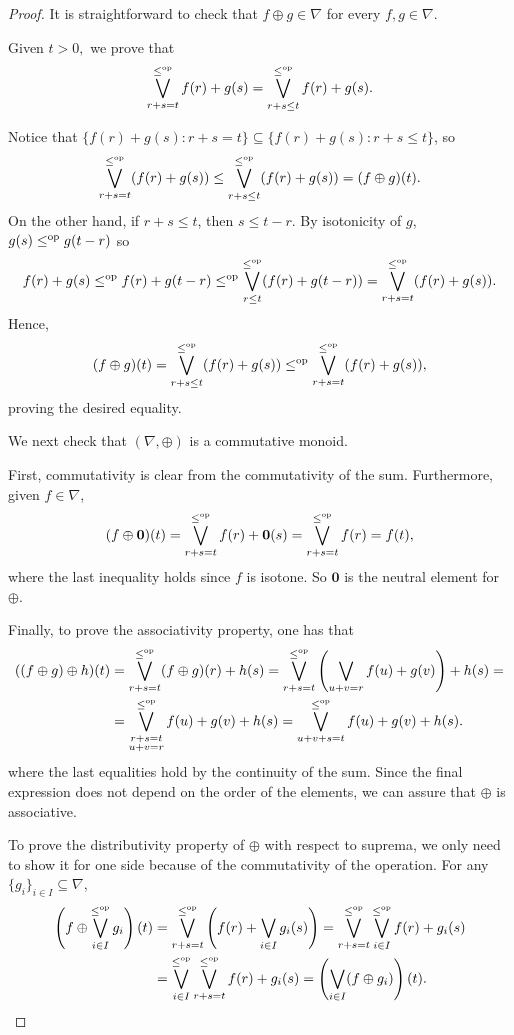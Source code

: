\documentclass[11pt,a4paper]{amsart}
\theoremstyle{definition}
\begin{document}
	\begin{proof}
		
		It is straightforward to check that $f\oplus g\in\nabla$ for every $f,g\in\nabla.$
		
		
		Given $t>0,$ we prove that
		$$\bigvee_{r+s=t}^{\leq^\text{\normalfont op}}f(r)+g(s)=\bigvee_{r+s\leq t}^{\leq^\text{\normalfont op}}f(r)+g(s).$$
		
		
		Notice that $\{f(r)+ g(s): r+s=t\}\subseteq \{f(r)+g(s): r+s\leq t\}$, so
		\[\bigvee_{r+s=t}^{\leq^\text{\normalfont op}}(f(r)+g(s))\leq\bigvee_{r+s\leq t}^{\leq^\text{\normalfont op}}(f(r)+ g(s))=(f\oplus g)(t).\]
		On the other hand, if $r+s\leq t$, then $s\leq t-r$. By isotonicity of $g$, $g(s)\leq^\text{\normalfont op} g(t-r)$ so $$f(r)+g(s)\leq^\text{\normalfont op} f(r)+g(t-r)\leq^\text{\normalfont op}\bigvee_{r\leq t}^{\leq^\text{\normalfont op}}(f(r)+ g(t-r))=\bigvee_{r+s=t}^{\leq^\text{\normalfont op}}(f(r)+g(s)).$$ Hence,
		\[(f\oplus g)(t)=\bigvee_{r+s\leq t}^{\leq^\text{\normalfont op}}(f(r)+g(s))\leq^\text{\normalfont op} \bigvee_{r+s=t}^{\leq^\text{\normalfont op}}(f(r)+g(s)),\]
		proving the desired equality.
		
		We next check that $(\nabla,\oplus)$ is a commutative monoid.
		
		First, commutativity is clear from the commutativity of the sum. Furthermore, given $f\in\nabla$,
		\[(f\oplus\mathbf{0})(t)=\bigvee_{r+s=t}^{\leq^\text{\normalfont op}}f(r)+\mathbf{0}(s)=\bigvee_{r+s=t}^{\leq^\text{\normalfont op}}f(r)=f(t),\]
		where the last inequality holds since $f$ is isotone. So $\mathbf{0}$ is the neutral element for $\oplus.$
		
		
		Finally, to prove the associativity property, one has that
		\begin{align*}
			((f\oplus g)\oplus h)(t)&=\bigvee_{r+s=t}^{\leq^\text{\normalfont op}}(f\oplus g)(r)+h(s)=\bigvee_{r+s=t}^{\leq^\text{\normalfont op}}\left(\bigvee_{u+v=r}f(u)+g(v)\right)+h(s)=\\			&=\bigvee_{\substack{r+s=t \\ u+v=r}}^{\leq^\text{\normalfont op}}f(u)+g(v)+ h(s)=\bigvee_{u+v+s=t}^{\leq^\text{\normalfont op}}f(u)+ g(v)+ h(s).
		\end{align*}
		where the last equalities hold by the continuity of the sum. Since the final expression does not depend on the order of the elements, we can assure that $\oplus$ is associative.
		
		
		
		To prove the distributivity property of $\oplus$ with respect to suprema, we only need to show it for one side because of the commutativity of the operation. For any $\{g_i\}_{i\in I}\subseteq\nabla$,
		\begin{align*}
			\left(f\oplus \bigvee_{i\in I}^{\leq^\text{\normalfont op}}g_i\right)(t)&=\bigvee_{r+s=t}^{\leq^\text{\normalfont op}}\left(f(r)+\bigvee_{i\in I}g_i(s)\right)=\bigvee_{r+s=t}^{\leq^\text{\normalfont op}}\bigvee_{i\in I}^{\leq^\text{\normalfont op}}f(r)+ g_i(s)\\&=\bigvee_{i\in I}^{\leq^\text{\normalfont op}}\bigvee_{r+s=t}^{\leq^\text{\normalfont op}}f(r)+ g_i(s)=\left(\bigvee_{i\in I}(f\oplus g_i)\right)(t).
		\end{align*}
		

\end{proof}
\end{document}

